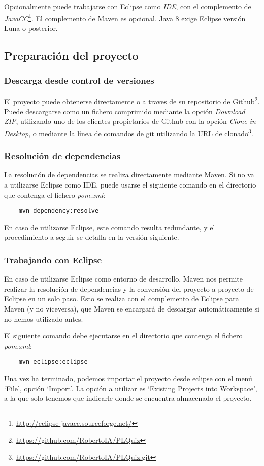 Opcionalmente puede trabajarse con Eclipse como \emph{IDE}, con el complemento de \emph{JavaCC}\footnote{\url{http://eclipse-javacc.sourceforge.net/}}.
El complemento de Maven es opcional.
Java 8 exige Eclipse versión Luna o posterior.

\subsection{Preparación del proyecto}
\subsubsection{Descarga desde control de versiones}
El proyecto puede obtenerse directamente o a traves de su repositorio de Github\footnote{\url{https://github.com/RobertoIA/PLQuiz}}. Puede descargarse como un fichero comprimido mediante la opción \emph{Download ZIP}, utilizando uno de los clientes propietarios de Github con la opción \emph{Clone in Desktop}, o mediante la línea de comandos de git utilizando la URL de clonado\footnote{\url{https://github.com/RobertoIA/PLQuiz.git}}.


\subsubsection{Resolución de dependencias}
La resolución de dependencias se realiza directamente mediante Maven.
Si no va a utilizarse Eclipse como IDE, puede usarse el siguiente comando en el directorio que contenga el fichero \emph{pom.xml}:
\begin{verbatim}
	mvn dependency:resolve
\end{verbatim}
En caso de utilizarse Eclipse, este comando resulta redundante, y el procedimiento a seguir se detalla en la versión siguiente.

\subsubsection{Trabajando con Eclipse}
En caso de utilizarse Eclipse como entorno de desarrollo, Maven nos permite realizar la resolución de dependencias y la conversión del proyecto a proyecto de Eclipse en un solo paso.
Esto se realiza con el complemento de Eclipse para Maven (y no viceversa), que Maven se encargará de descargar automáticamente si no hemos utilizado antes.

El siguiente comando debe ejecutarse en el directorio que contenga el fichero \emph{pom.xml}:
\begin{verbatim}
	mvn eclipse:eclipse
\end{verbatim}
Una vez ha terminado, podemos importar el proyecto desde eclipse con el menú `File', opción `Import'.
La opción a utilizar es `Existing Projects into Workspace', a la que solo tenemos que indicarle donde se encuentra almacenado el proyecto.

